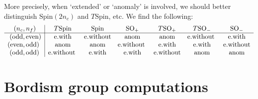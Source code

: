 \documentclass[12pt]{article}
\numberwithin{equation}{section}
\def\SO{\mathrm{SO}}
\def\Spin{\mathrm{Spin}}
\begin{document}
More precisely, when `extended' or `anomaly' is involved, 
we should better distinguish $\Spin(2n_c)$ and $T\Spin$, etc.
We find the following:{\small \begin{equation}
\begin{array}{r@{\,}l|cccccc}
(n_c,&n_f)  & T\Spin & \Spin & \SO_+ & T\SO_+& T\SO_- & \SO_- \\
\hline
(\text{odd},&\text{even}) & \text{e.with} &\text{e.without} & \text{anom} & \text{anom} & \text{e.without } & \text{e.with} \\
(\text{even},&\text{odd}) & \text{anom} & \text{anom} & \text{e.without } & \text{e.with}  & \text{e.with} & \text{e.without} \\
(\text{odd},&\text{odd}) & \text{e.without } & \text{e.with} & \text{e.with} & \text{e.without}
 &  \text{anom} & \text{anom}   \end{array} 
\end{equation}}


\appendix
\section{Bordism group computations}
\label{sec:bordism}
\end{document}
